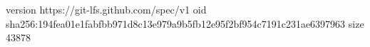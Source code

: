version https://git-lfs.github.com/spec/v1
oid sha256:194fea01e1fabfbb971d8c13e979a9b5fb12e95f2bf954c7191c231ae6397963
size 43878
